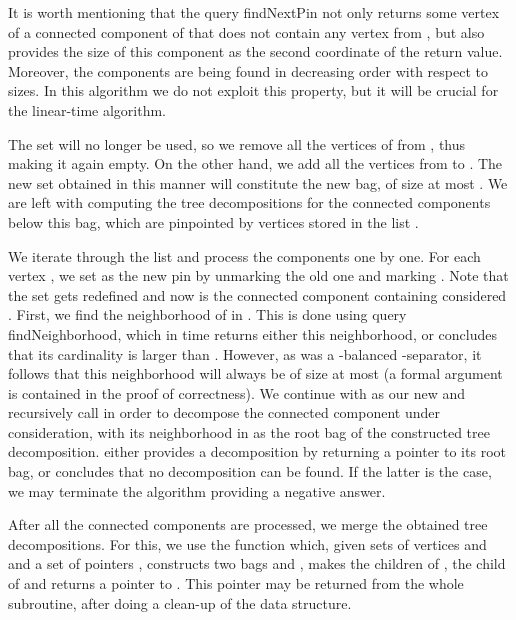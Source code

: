 \documentclass[a4paper,11pt]{article}
\theoremstyle{definition}
\theoremstyle{remark}
\newcommand{\qnei}{\textnormal{findNeighborhood}}
\newcommand{\qpin}{\textnormal{findNextPin}}
\begin{document}
It is worth mentioning that the query \qpin{} not only returns some
vertex  of a connected component of  that does not contain any vertex from , but also provides
the size of this component as the second coordinate of the return
value.  Moreover, the components are being found in decreasing order
with respect to sizes.  In this algorithm we do not exploit this
property, but it will be crucial for the linear-time algorithm.

The set  will no longer be used, so we remove all the vertices of
 from , thus making it again empty.  On the other hand, we
add all the vertices from  to .  The new set  obtained in
this manner will constitute the new bag, of size at most
.  We are left with computing the tree
decompositions for the connected components below this bag, which are
pinpointed by vertices stored in the list .

We iterate through the list  and process the components one by
one.  For each vertex , we set  as the new pin by
unmarking the old one and marking .  Note that the set  gets
redefined and now is the connected component containing considered
.  First, we find the neighborhood of  in .  This is done
using query \qnei, which in  time returns either this
neighborhood, or concludes that its cardinality is larger than .
However, as  was a -balanced -separator, it follows
that this neighborhood will always be of size at most  (a formal
argument is contained in the proof of correctness).  We continue with
 as our new  and recursively call  in order
to decompose the connected component under consideration, with its
neighborhood in  as the root bag of the constructed tree
decomposition.   either provides a decomposition by returning
a pointer to its root bag, or concludes that no decomposition can be
found.  If the latter is the case, we may terminate the algorithm
providing a negative answer.

After all the connected components are processed, we merge the
obtained tree decompositions.  For this, we use the function
 which, given sets of vertices  and  and a set of
pointers , constructs two bags  and , makes
 the children of ,  the child of  and returns a pointer
to .  This pointer may be returned from the whole subroutine, after
doing a clean-up of the data structure.
\end{document}
